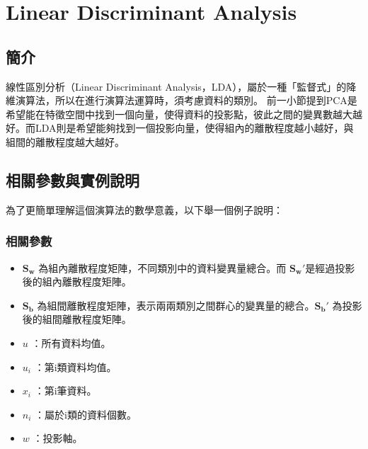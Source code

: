 \chapter{Linear Discriminant Analysis}
\label{chapter:lda}
\section{簡介}
\label{sec:LdaIntroduction}





線性區別分析（Linear Discriminant Analysis，LDA），屬於一種「監督式」的降維演算法，所以在進行演算法運算時，須考慮資料的類別。
前一小節提到PCA是希望能在特徵空間中找到一個向量，使得資料的投影點，彼此之間的變異數越大越好。而LDA則是希望能夠找到一個投影向量，使得組內的離散程度越小越好，與組間的離散程度越大越好。




\section{相關參數與實例說明}
為了更簡單理解這個演算法的數學意義，以下舉一個例子說明：


\subsection{相關參數}

\begin{itemize}
	\item
	      \(\mathbf{S_w}\) 為組內離散程度矩陣，不同類別中的資料變異量總合。而 \(\mathbf{{S_w}'}\)是經過投影後的組內離散程度矩陣。
	\item
	      \(\mathbf{S_b}\) 為組間離散程度矩陣，表示兩兩類別之間群心的變異量的總合。\(\mathbf{{S_b}'}\) 為投影後的組間離散程度矩陣。
	\item
	      \(u\) ：所有資料均值。
	\item
	      \(u_i\) ：第i類資料均值。
	\item
	      \(x_i\) ：第i筆資料。
	\item
	      \(n_i\) ：屬於i類的資料個數。
	\item
	      \(w\) ：投影軸。
\end{itemize}

